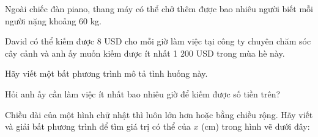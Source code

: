 \begin{practice}
\begin{questions}[resume=SBT]
\begin{questions}
            \answerline
            \answerline
            \item Ngoài chiếc đàn piano, thang máy có thể chở thêm được bao nhiêu người biết mỗi người nặng khoảng 60 kg.

            \answerline
            \answerline
        \end{questions}

        \item David có thể kiếm được 8 USD cho mỗi giờ làm việc tại công ty chuyên chăm sóc cây cảnh và anh ấy muốn kiếm được ít nhất 1 200 USD trong mùa hè này.
        \begin{questions}
            \item Hãy viết một bất phương trình mô tả tình huống này.

            \answerline
            \item Hỏi anh ấy cần làm việc ít nhất bao nhiêu giờ để kiếm được số tiền trên?

            \answerline
        \end{questions}

        \item Chiều dài của một hình chữ nhật thì luôn lớn hơn hoặc bằng chiều rộng. Hãy viết và giải bất phương trình để tìm giá trị có thể của $x$ (cm) trong hình vẽ dưới đây:

        \begin{center}
        \end{center}

        \answerline
        \answerline
    \end{questions}
\end{practice}
